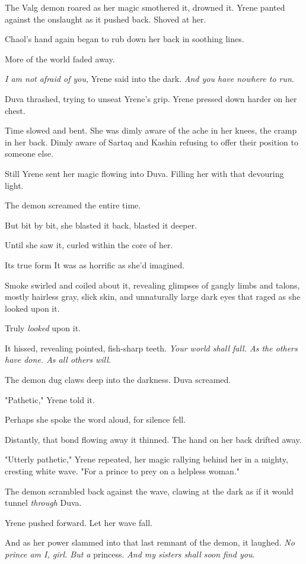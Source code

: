 The Valg demon roared as her magic smothered it, drowned it. Yrene panted against the onslaught as it pushed back. Shoved at her.

Chaol's hand again began to rub down her back in soothing lines.

More of the world faded away.

\emph{I am not afraid of you}, Yrene said into the dark. \emph{And you have nowhere to run.}

Duva thrashed, trying to unseat Yrene's grip. Yrene pressed down harder on her chest.

Time slowed and bent. She was dimly aware of the ache in her knees, the cramp in her back. Dimly aware of Sartaq and Kashin refusing to offer their position to someone else.

Still Yrene sent her magic flowing into Duva. Filling her with that devouring light.

The demon screamed the entire time.

But bit by bit, she blasted it back, blasted it deeper.

Until she saw it, curled within the core of her.

Its true form  It was as horrific as she'd imagined.

Smoke swirled and coiled about it, revealing glimpses of gangly limbs and talons, mostly hairless gray, slick skin, and unnaturally large dark eyes that raged as she looked upon it.

Truly \emph{looked} upon it.

It hissed, revealing pointed, fish-sharp teeth. \emph{Your world shall fall. As the others have done. As all others will.}

The demon dug claws deep into the darkness. Duva screamed.

"Pathetic," Yrene told it.

Perhaps she spoke the word aloud, for silence fell.

Distantly, that bond flowing away  it thinned. The hand on her back drifted away.

"Utterly pathetic," Yrene repeated, her magic rallying behind her in a mighty, cresting white wave. "For a prince to prey on a helpless woman."

The demon scrambled back against the wave, clawing at the dark as if it would tunnel \emph{through} Duva.

Yrene pushed forward. Let her wave fall.

And as her power slammed into that last remnant of the demon, it laughed. \emph{No prince am I, girl. But a} princess. \emph{And my sisters shall soon find you}.

